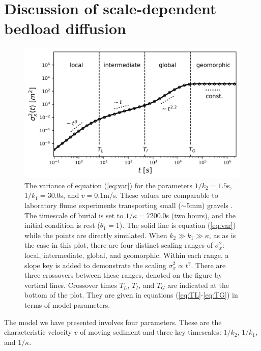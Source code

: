 \documentclass[]{agujournal2018}
\begin{document}
\section{Discussion of scale-dependent bedload diffusion}
\label{sec:discussion}
\begin{figure}[t]	
	\includegraphics[width=\linewidth,keepaspectratio]{./figures/diffusion.png}
	\caption{The variance of equation (\ref{eq:var}) for the parameters $1/k_2 = 1.5$s, $1/k_1 = 30.0$s, and $v=0.1$m/s. These values are comparable to laboratory flume experiments transporting small ($\sim 5$mm) gravels \citep[cf.][]{Lajeunesse2010,Martin2012}. The timescale of burial is set to $1/\kappa = 7200.0$s (two hours), and the initial condition is rest ($\theta_1=1$). The solid line is equation (\ref{eq:var}) while the points are directly simulated. When $k_2\gg k_1 \gg \kappa$, as as is the case in this plot, there are four distinct scaling ranges of $\sigma_x^2$: local, intermediate, global, and geomorphic. Within each range, a slope key is added to demonstrate the scaling $\sigma_x^2 \propto t^\gamma$. There are three crossovers between these ranges, denoted on the figure by vertical lines. Crossover times $T_L$, $T_I$, and $T_G$ are indicated at the bottom of the plot. They are given in equations (\ref{eq:TL}-\ref{eq:TG}) in terms of model parameters. }
	\label{fig:var}
\end{figure}
The model we have presented involves four parameters. These are the characteristic velocity $v$ of moving sediment and three key timescales: $1/k_2$, $1/k_1$, and $1/\kappa$.
\end{document}
